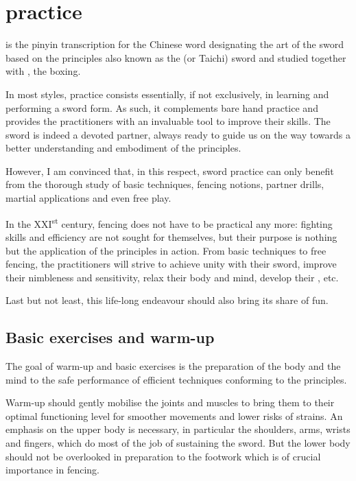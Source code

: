 \chapter{\Taijijian{} practice}
\Taijijian{} is the pinyin transcription for the Chinese word designating the art of the sword based on the \Taiji{} principles \textendash{} also known as the \Taiji{} (or Taichi) sword \textendash{}  and studied together with \Taijiquan{}, the \Taiji{} boxing.

In most styles, \Taijijian{} practice consists essentially, if not exclusively, in learning and performing a sword form.
As such, it complements bare hand practice and provides the practitioners with an invaluable tool to improve their skills.
The sword is indeed a devoted partner, always ready to guide us on the way towards a better understanding and embodiment of the \Taiji{} principles.

However, I am convinced that, in this respect, \Taiji{} sword practice can only benefit from the thorough study of basic techniques, fencing notions, partner drills, martial applications and even free play.

In the XXI\textsuperscript{st} century, \Taiji{} fencing does not have to be practical any more: fighting skills and efficiency are not sought for themselves, but their purpose is nothing but the application of the \Taiji{} principles in action. From basic techniques to free fencing, the practitioners will strive to achieve unity with their sword, improve their nimbleness and sensitivity, relax their body and mind, develop their \Yi{}, etc. 

Last but not least, this life-long endeavour should also bring its share of fun.

\section{Basic exercises and warm-up}
The goal of warm-up and basic exercises is the preparation of the body and the mind to the safe performance of efficient techniques conforming to the \Taiji{} principles.

Warm-up should gently mobilise the joints and muscles to bring them to their optimal functioning level for smoother movements and lower risks of strains.
An emphasis on the upper body is necessary, in particular the shoulders, arms, wrists and fingers, which do most of the job of sustaining the sword.
But the lower body should not be overlooked in preparation to the footwork which is of crucial importance in fencing.

